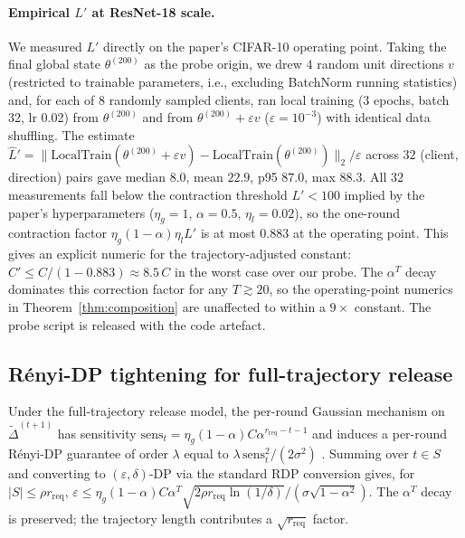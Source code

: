 \paragraph{Empirical $L'$ at ResNet-18 scale.}
We measured $L'$ directly on the paper's CIFAR-10 operating point. Taking the final
global state $\theta^{(200)}$ as the probe origin, we drew $4$ random unit
directions $v$ (restricted to trainable parameters, i.e., excluding BatchNorm
running statistics) and, for each of $8$ randomly sampled clients, ran local
training (3 epochs, batch 32, lr 0.02) from $\theta^{(200)}$ and from
$\theta^{(200)} + \varepsilon v$ ($\varepsilon = 10^{-3}$) with identical data
shuffling. The estimate $\hat L' = \| \mathrm{LocalTrain}(\theta^{(200)} + \varepsilon v) - \mathrm{LocalTrain}(\theta^{(200)}) \|_2 / \varepsilon$
across $32$ (client, direction) pairs gave
median $8.0$, mean $22.9$, p95 $87.0$, max $88.3$. All $32$ measurements fall
below the contraction threshold $L' < 100$ implied by the paper's hyperparameters
($\eta_g = 1$, $\alpha = 0.5$, $\eta_l = 0.02$), so the one-round contraction
factor $\eta_g (1-\alpha) \eta_l L'$ is at most $0.883$ at the operating point.
This gives an explicit numeric for the trajectory-adjusted constant: $C' \le C /
(1 - 0.883) \approx 8.5\,C$ in the worst case over our probe. The $\alpha^T$
decay dominates this correction factor for any $T \gtrsim 20$, so the
operating-point numerics in Theorem~\ref{thm:composition} are unaffected to within
a $9\times$ constant. The probe script is released with the code artefact.

\subsection{R\'enyi-DP tightening for full-trajectory release}
\label{app:rdp}

Under the full-trajectory release model, the per-round Gaussian mechanism on
$\tilde\Delta^{(t+1)}$ has sensitivity $\mathrm{sens}_t = \eta_g (1-\alpha) C
\alpha^{r_\mathrm{req}-t-1}$ and induces a per-round R\'enyi-DP guarantee of order
$\lambda$ equal to $\lambda\, \mathrm{sens}_t^2 / (2\sigma^2)$
\cite{mironov2017renyi}. Summing over $t \in S$ and converting to $(\varepsilon,
\delta)$-DP via the standard RDP conversion gives, for $|S| \le \rho r_\mathrm{req}$,
$\varepsilon \le \eta_g (1-\alpha) C \alpha^T \sqrt{2 \rho r_\mathrm{req} \ln(1/\delta)}
/ (\sigma \sqrt{1 - \alpha^2})$. The $\alpha^T$ decay is preserved; the trajectory
length contributes a $\sqrt{r_\mathrm{req}}$ factor.
